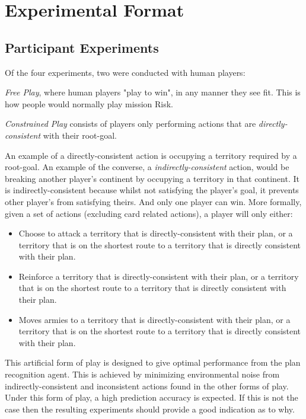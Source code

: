 \documentclass[parskip]{cs4rep}
\begin{document}
\section{Experimental Format}

\subsection{Participant Experiments}

Of the four experiments, two were conducted with human players: 

\textit{Free Play}, where human players "play to win", in any manner they see fit. This is how people would normally play mission Risk.

\textit{Constrained Play} consists of players only performing actions that are \textit{directly-consistent} with their root-goal. 

An example of a directly-consistent action is occupying a territory required by a root-goal. An example of the converse, a \textit{indirectly-consistent} action, would be breaking another player's continent by occupying a territory in that continent. It is indirectly-consistent because whilst not satisfying the player's goal, it prevents other player's from satisfying theirs. And only one player can win. 
More formally, given a set of actions (excluding card related actions), a player will only either:

\begin{itemize}
\item
Choose to attack a territory that is directly-consistent with their plan, or a territory that is on the shortest route to a territory that is directly consistent with their plan.
\item
Reinforce a territory that is directly-consistent with their plan, or a territory that is on the shortest route to a territory that is directly consistent with their plan.
\item
Moves armies to a territory that is directly-consistent with their plan, or a territory that is on the shortest route to a territory that is directly consistent with their plan.
\end{itemize}

This artificial form of play is designed to give optimal performance from the plan recognition agent. This is achieved by minimizing environmental noise from indirectly-consistent and inconsistent actions found in the other forms of play. Under this form of play, a high prediction accuracy is expected. If this is not the case then the resulting experiments should provide a good indication as to why.
\end{document}
